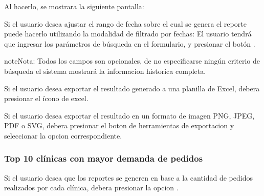 \documentclass[a4paper,10pt,spanish]{sphinxmanual}
\begin{document}

Al hacerlo, se mostrara la siguiente pantalla:


Si el usuario desea ajustar el rango de fecha sobre el cual se genera el reporte puede hacerlo utilizando la modalidad de filtrado por fechas:
El usuario tendrá que ingresar los parámetros de búsqueda en el formulario, y presionar el botón .

\begin{notice}{note}{Nota:}
Todos los campos son opcionales, de no especificarse ningún criterio de búsqueda el sistema mostrará la informacion historica completa.
\end{notice}


Si el usuario desea exportar el resultado generado a una planilla de Excel, debera presionar el ícono de excel.


Si el usuario desea exportar el resultado en un formato de imagen PNG, JPEG, PDF o SVG, debera presionar el boton de herramientas de exportacion y seleccionar la opcion correspondiente.



\subsubsection{Top 10 clínicas con mayor demanda de pedidos}
\label{pedidosclinica:top-10-clinicas-con-mayor-demanda-de-pedidos}\label{pedidosclinica:top10-peds-pc}
Si el usuario desea que los reportes se generen en base a la cantidad de pedidos realizados por cada clínica, debera presionar la opcion .
\end{document}
